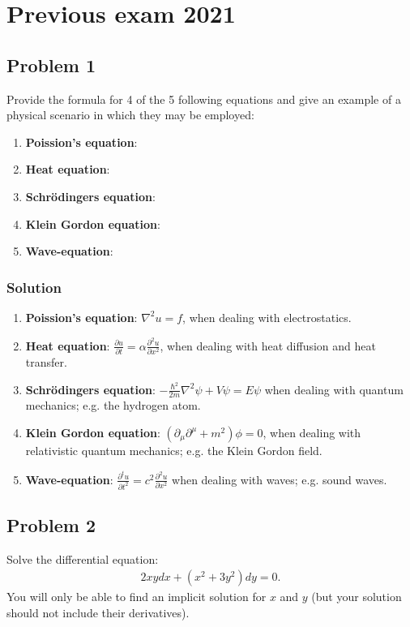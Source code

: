 \section{Previous exam 2021}

\subsection*{Problem 1}
Provide the formula for 4 of the 5 following equations and give an example of a physical scenario in which they may be employed:
\begin{enumerate}
    \item \textbf{Poission's equation}:
    \item \textbf{Heat equation}:
    \item \textbf{Schrödingers equation}:
    \item \textbf{Klein Gordon equation}:
    \item \textbf{Wave-equation}:
\end{enumerate}
\subsubsection*{Solution}
\begin{enumerate}
    \item \textbf{Poission's equation}: $\nabla^2u = f$, when dealing with electrostatics.
    \item \textbf{Heat equation}: $\frac{\partial u}{\partial t} = \alpha \frac{\partial^2 u}{\partial x^2}$, when dealing with heat diffusion and heat transfer.
    \item \textbf{Schrödingers equation}: $-\frac{\hbar^2}{2m}\nabla^2\psi + V\psi= E\psi$ when dealing with quantum mechanics; e.g. the hydrogen atom.
    \item \textbf{Klein Gordon equation}: $(\partial_\mu\partial^\mu + m^2)\phi = 0$, when dealing with relativistic quantum mechanics; e.g. the Klein Gordon field.
    \item \textbf{Wave-equation}: $\frac{\partial^t u}{\partial t^2} = c^2 \frac{\partial^2 u}{\partial x^2}$ when dealing with waves; e.g. sound waves.
\end{enumerate}

\subsection*{Problem 2}
Solve the differential equation:
\begin{align*}
    2xydx + (x^2 + 3y^2)dy = 0.
\end{align*}
\note You will only be able to find an implicit solution for $x$ and $y$ (but your solution should
not include their derivatives).

